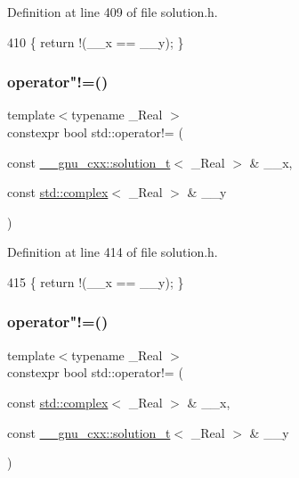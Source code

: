 Definition at line 409 of file solution.\+h.


\begin{DoxyCode}
410     \{ \textcolor{keywordflow}{return} !(\_\_x == \_\_y); \}
\end{DoxyCode}
\mbox{\label{namespacestd_a613014e2e7afb3c131c9530988e20417}} 
\subsubsection{\texorpdfstring{operator"!=()}{operator!=()}\hspace{0.1cm}{\footnotesize\ttfamily [4/5]}}
{\footnotesize\ttfamily template$<$typename \+\_\+\+Real $>$ \\
constexpr bool std\+::operator!= (\begin{DoxyParamCaption}\item[{const \hyperlink{namespace____gnu__cxx_ae20ea642de50eb361074c62676b0159c}{\+\_\+\+\_\+gnu\+\_\+cxx\+::solution\+\_\+t}$<$ \+\_\+\+Real $>$ \&}]{\+\_\+\+\_\+x,  }\item[{const \hyperlink{classstd_1_1complex}{std\+::complex}$<$ \+\_\+\+Real $>$ \&}]{\+\_\+\+\_\+y }\end{DoxyParamCaption})}



Definition at line 414 of file solution.\+h.


\begin{DoxyCode}
415     \{ \textcolor{keywordflow}{return} !(\_\_x == \_\_y); \}
\end{DoxyCode}
\mbox{\label{namespacestd_ad62f982d25741aa725c67cb3380782d9}} 
\subsubsection{\texorpdfstring{operator"!=()}{operator!=()}\hspace{0.1cm}{\footnotesize\ttfamily [5/5]}}
{\footnotesize\ttfamily template$<$typename \+\_\+\+Real $>$ \\
constexpr bool std\+::operator!= (\begin{DoxyParamCaption}\item[{const \hyperlink{classstd_1_1complex}{std\+::complex}$<$ \+\_\+\+Real $>$ \&}]{\+\_\+\+\_\+x,  }\item[{const \hyperlink{namespace____gnu__cxx_ae20ea642de50eb361074c62676b0159c}{\+\_\+\+\_\+gnu\+\_\+cxx\+::solution\+\_\+t}$<$ \+\_\+\+Real $>$ \&}]{\+\_\+\+\_\+y }\end{DoxyParamCaption})}



